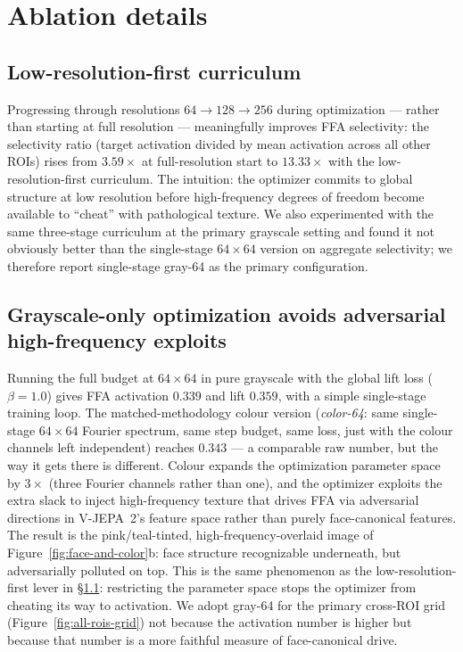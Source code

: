 \documentclass{article}
\begin{document}



\appendix
\section{Ablation details}
\label{app:ablations}

\subsection{Low-resolution-first curriculum}
\label{sec:lowres}
Progressing through resolutions $64 \to 128 \to 256$ during optimization --- rather than starting at full resolution --- meaningfully improves FFA selectivity: the selectivity ratio (target activation divided by mean activation across all other ROIs) rises from $3.59\times$ at full-resolution start to $13.33\times$ with the low-resolution-first curriculum. The intuition: the optimizer commits to global structure at low resolution before high-frequency degrees of freedom become available to ``cheat'' with pathological texture. We also experimented with the same three-stage curriculum at the primary grayscale setting and found it not obviously better than the single-stage $64\times64$ version on aggregate selectivity; we therefore report single-stage gray-64 as the primary configuration.

\subsection{Grayscale-only optimization avoids adversarial high-frequency exploits}
\label{sec:grayscale}
Running the full budget at $64\times64$ in pure grayscale with the global lift loss ($\beta=1.0$) gives FFA activation $0.339$ and lift $0.359$, with a simple single-stage training loop. The matched-methodology colour version (\emph{color-64}: same single-stage $64\times64$ Fourier spectrum, same step budget, same loss, just with the colour channels left independent) reaches $0.343$ --- a comparable raw number, but the way it gets there is different. Colour expands the optimization parameter space by $3\times$ (three Fourier channels rather than one), and the optimizer exploits the extra slack to inject high-frequency texture that drives FFA via adversarial directions in V-JEPA~2's feature space rather than purely face-canonical features. The result is the pink/teal-tinted, high-frequency-overlaid image of Figure~\ref{fig:face-and-color}b: face structure recognizable underneath, but adversarially polluted on top. This is the same phenomenon as the low-resolution-first lever in \S\ref{sec:lowres}: restricting the parameter space stops the optimizer from cheating its way to activation. We adopt gray-64 for the primary cross-ROI grid (Figure~\ref{fig:all-rois-grid}) not because the activation number is higher but because that number is a more faithful measure of face-canonical drive.
\end{document}
